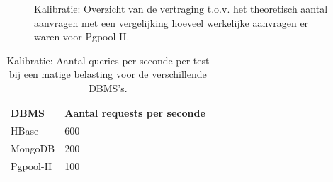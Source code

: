 \begin{figure}[htb!] 
	\centering
	\caption{Kalibratie: Overzicht van de vertraging t.o.v. het theoretisch aantal aanvragen met een vergelijking hoeveel werkelijke aanvragen er waren voor Pgpool-II. }
	\label{fig:calibratie-queriesperseconde-pgpool-ii}
\end{figure}

\begin{table}[htb!]
	\centering
	\begin{tabular}{l| l }
		\textbf{DBMS} & Aantal requests per seconde \\
		\hline
		HBase & 600 \\
		MongoDB & 200\\
		Pgpool-II & 100\\
	\end{tabular}
	\caption{Kalibratie: Aantal queries per seconde per test bij een matige belasting voor de verschillende DBMS's.}
	\label{table:calibratie-queriesperseconde-resultaat}
\end{table}


